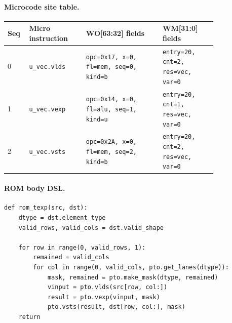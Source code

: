 \paragraph{Microcode site table.}
{\scriptsize
\begin{longtable}{@{}R{0.055\linewidth}L{0.23\linewidth}L{0.31\linewidth}L{0.22\linewidth}@{}}
\toprule
Seq & Micro instruction & WO[63:32] fields & WM[31:0] fields \\
 & \texttt{u\_vec.vlds} & \texttt{opc=0x17, x=0, fl=mem, seq=0, kind=b} & \texttt{entry=20, cnt=2, res=vec, var=0} \\
1 & \texttt{u\_vec.vexp} & \texttt{opc=0x14, x=0, fl=alu, seq=1, kind=u} & \texttt{entry=20, cnt=1, res=vec, var=0} \\
2 & \texttt{u\_vec.vsts} & \texttt{opc=0x2A, x=0, fl=mem, seq=2, kind=b} & \texttt{entry=20, cnt=2, res=vec, var=0} \\
\bottomrule
\end{longtable}
}
\paragraph{ROM body DSL.}
\begin{lstlisting}[style=ptocode]
def rom_texp(src, dst):
    dtype = dst.element_type
    valid_rows, valid_cols = dst.valid_shape

    for row in range(0, valid_rows, 1):
        remained = valid_cols
        for col in range(0, valid_cols, pto.get_lanes(dtype)):
            mask, remained = pto.make_mask(dtype, remained)
            vinput = pto.vlds(src[row, col:])
            result = pto.vexp(vinput, mask)
            pto.vsts(result, dst[row, col:], mask)
    return
\end{lstlisting}
\Needspace{0.34\textheight}
